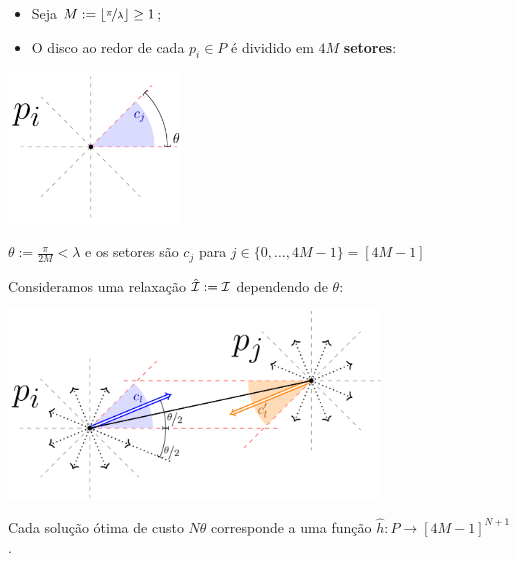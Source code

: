 \begin{frame}{}
    \begin{itemize}[<+->]
        \item Seja $M := \lfloor\nicefrac{\pi}{\lambda}\rfloor \geq 1$;

        \item O disco ao redor de cada $p_i\in P$ é dividido em $4M$ \textbf{setores}:
    \end{itemize}
    
    \bigskip
    \pause
    \begin{minipage}{\linewidth}
        \centering
        \includegraphics[height=4cm]{MSC/angle.png}
    \end{minipage}

    \bigskip
    \centering
    $\theta := \frac{\pi}{2M} < \lambda$ e os setores são $c_j$ para $j \in \{0, \dots, 4M-1 \}=[4M-1]$
\end{frame}

\begin{frame}{}
    Consideramos uma relaxação ${\hat {\mathcal{I}}:= \mathcal{I}}$ dependendo de $\theta$:
    
    \bigskip
    \pause
    \begin{minipage}{\linewidth}
        \centering
        \includegraphics[height=5cm]{MSC/discrete.png}
    \end{minipage}
\end{frame}

\begin{frame}{}
    \begin{obs}
        Cada solução ótima de custo $N \theta$ corresponde a uma função \mbox{$\hat h\colon P \to [4M-1]^{N+1}$}.
    \end{obs}
\end{frame}

